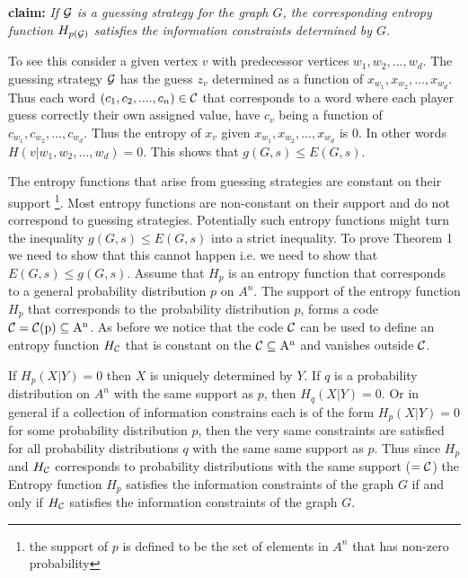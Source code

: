 \documentclass[12pt]{article}
\begin{document}
\noindent
{\bf claim:}
{\it If $\cal{G}$ is a guessing strategy for the graph $G$, the corresponding entropy function 
$H_{p(\cal{G})}$ satisfies the information constraints determined by $G$.}

To see this consider a given vertex $v$ with predecessor vertices $w_1,w_2,...,w_d$. The guessing strategy $\cal{G}$ has the guess $z_v$  determined as a function of \newline
$x_{w_{1}},x_{w_{2}}, \ldots, x_{w_{d}}$.  
Thus each word $(c_1,c_2,.... ,c_n) \in \cal{C}$ that corresponds to a word where each player guess correctly their own assigned value, have $c_{v}$ being a function of 
$c_{w_{1}},c_{w_{2}}, \ldots, c_{w_{d}}$.  Thus the entropy of $x_{v}$ given  
$x_{w_1},x_{w_2}, \ldots, x_{w_d}$ is $0$.
In other words  \newline $H(v | w_1, w_2, \ldots, w_d)=0$.
This shows that $g(G,s) \leq E(G,s)$. 

The entropy functions that arise from guessing strategies
are constant on their support \footnote{the support of $p$ is defined to be the set of elements in $A^n$ that has non-zero probability}. Most entropy functions are non-constant on their support and do not correspond to guessing strategies. Potentially such entropy functions might turn the inequality $g(G,s) \leq E(G,s)$ into a strict inequality. To prove Theorem 1 we need to show that this cannot happen i.e. 
we need to show that $E(G,s) \leq g(G,s)$.  Assume that $H_p$ is an entropy function that corresponds to a general probability distribution $p$ on $A^n$. The support of the entropy function $H_p$ that corresponds to the probability distribution $p$, forms a code $\cal{C}=\cal{C}({\rm p}) \subseteq {\rm A}^{\rm n}$. As before we notice that the code $\cal{C}$ can be used to define an entropy function $H_{\cal{C}}$ that is constant on the $\cal{C} \subseteq {\rm A}^{\rm n}$ and vanishes outside $\cal{C}$. 

If $H_p(X | Y)=0$ then $X$ is uniquely determined by $Y$.  If $q$ is a probability distribution on $A^n$
with the same support as $p$, then $H_q(X | Y)=0$. 
Or in general if a collection of information constrains each is of the form 
$H_p(X|Y)=0$ for some probability distribution $p$, then the very same constraints are satisfied for all probability distributions $q$ with the same same support as $p$. Thus since $H_p$ and $H_{\cal{C}}$
corresponds to probability distributions with the same support ($=\cal{C}$) 
the Entropy function $H_p$ satisfies the information constraints of the graph $G$ if and only if
$H_{\cal{C}}$ satisfies the information constraints of the graph $G$. 
\end{document}
